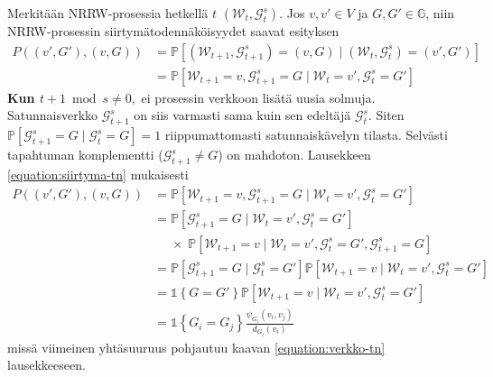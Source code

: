 \documentclass[finnish, 12pt, a4paper, sci, utf8, pdfa]{aaltothesis}
\newcommand{\Grandom}{\mathcal{G}}
\newcommand{\Wrandom}{\mathcal{W}}
\newcommand{\indicator}{\mathopen{\mathds{1}}}
\newcommand*{\prob}{\mathbb{P}}
\begin{document}
Merkitään NRRW-prosessia hetkellä $ t $ $ (\Wrandom_{t}, \Grandom^{s}_{t}) $. Jos $ v, v' \in V $ ja $ G, G' \in \mathbb{G} $, niin NRRW-prosessin siirtymätodennäköisyydet saavat esityksen
\begin{align}
   P\left( (v', G'), (v, G) \right) &= \prob \left[ (\Wrandom_{t+1}, \Grandom^{s}_{t+1}) = (v, G) \mid (\Wrandom_{t}, \Grandom^{s}_{t}) = (v', G') \right] \\
                                    &= \prob \left[ \Wrandom_{t+1} = v, \Grandom^{s}_{t+1} = G \mid \Wrandom_{t} = v', \Grandom^{s}_{t} = G' \right]
   \label{equation:siirtyma-tn}
\end{align}
\textbf{Kun $ t + 1 \bmod s \neq 0, $} ei prosessin verkkoon lisätä uusia solmuja. Satunnaisverkko $ \Grandom^{s}_{t+1} $ on siis varmasti sama kuin sen edeltäjä $ \Grandom^{s}_{t} $. Siten
$ \prob \left[ \Grandom^{s}_{t+1} = G \mid \Grandom^{s}_{t} = G \right] = 1 $
riippumattomasti satunnaiskävelyn tilasta. Selvästi tapahtuman komplementti ($ \Grandom^{s}_{t+1} \neq G $) on mahdoton. Lausekkeen \ref{equation:siirtyma-tn} mukaisesti
\begin{align*}
   P\left( (v', G'), (v, G) \right) &= \prob \left[ \Wrandom_{t+1} = v, \Grandom^{s}_{t+1} = G \mid \Wrandom_{t} = v', \Grandom^{s}_{t} = G' \right] \\
   &= \prob \left[ \Grandom^{s}_{t+1} = G \mid \Wrandom_{t} = v', \Grandom^{s}_{t} = G' \right] \\
   &\mathrel{\phantom{=}} \times \; \prob \left[ \Wrandom_{t+1} = v \mid \Wrandom_{t} = v', \Grandom^{s}_{t} = G', \Grandom^{s}_{t+1} = G \right] \\
   &= \prob \left[ \Grandom^{s}_{t+1} = G \mid \Grandom^{s}_{t} = G' \right] \prob \left[ \Wrandom_{t+1} = v \mid \Wrandom_{t} = v', \Grandom^{s}_{t} = G' \right] \\
   &= \indicator \left\{ G = G' \right\} \prob \left[ \Wrandom_{t+1} = v \mid \Wrandom_{t} = v', \Grandom^{s}_{t} = G' \right] \\
   &= \indicator \left\{ G_{i} = G_{j} \right\} \frac{\psi_{G_{i}}(v_{i}, v_{j})}{d_{G_{i}}(v_{i})}
\end{align*}
missä viimeinen yhtäsuuruus pohjautuu kaavan \ref{equation:verkko-tn} lausekkeeseen.

\vspace{0.5cm}
\end{document}
